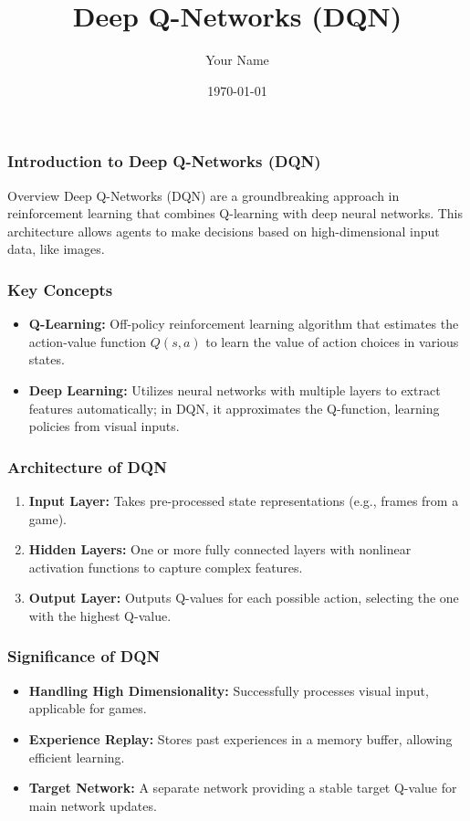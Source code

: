 \documentclass{beamer}
\title{Deep Q-Networks (DQN)}
\author{Your Name}
\institute{Your Institution}
\date{\today}
\begin{document}
\frame{\titlepage}

\begin{frame}[fragile]
    \frametitle{Introduction to Deep Q-Networks (DQN)}
    \begin{block}{Overview}
        Deep Q-Networks (DQN) are a groundbreaking approach in reinforcement learning that combines Q-learning with deep neural networks. This architecture allows agents to make decisions based on high-dimensional input data, like images.
    \end{block}
\end{frame}

\begin{frame}[fragile]
    \frametitle{Key Concepts}
    \begin{itemize}
        \item \textbf{Q-Learning:} Off-policy reinforcement learning algorithm that estimates the action-value function \( Q(s, a) \) to learn the value of action choices in various states.
        \item \textbf{Deep Learning:} Utilizes neural networks with multiple layers to extract features automatically; in DQN, it approximates the Q-function, learning policies from visual inputs.
    \end{itemize}
\end{frame}

\begin{frame}[fragile]
    \frametitle{Architecture of DQN}
    \begin{enumerate}
        \item \textbf{Input Layer:} Takes pre-processed state representations (e.g., frames from a game).
        \item \textbf{Hidden Layers:} One or more fully connected layers with nonlinear activation functions to capture complex features.
        \item \textbf{Output Layer:} Outputs Q-values for each possible action, selecting the one with the highest Q-value.
    \end{enumerate}
\end{frame}

\begin{frame}[fragile]
    \frametitle{Significance of DQN}
    \begin{itemize}
        \item \textbf{Handling High Dimensionality:} Successfully processes visual input, applicable for games.
        \item \textbf{Experience Replay:} Stores past experiences in a memory buffer, allowing efficient learning.
        \item \textbf{Target Network:} A separate network providing a stable target Q-value for main network updates.
    \end{itemize}
\end{frame}
\end{document}
